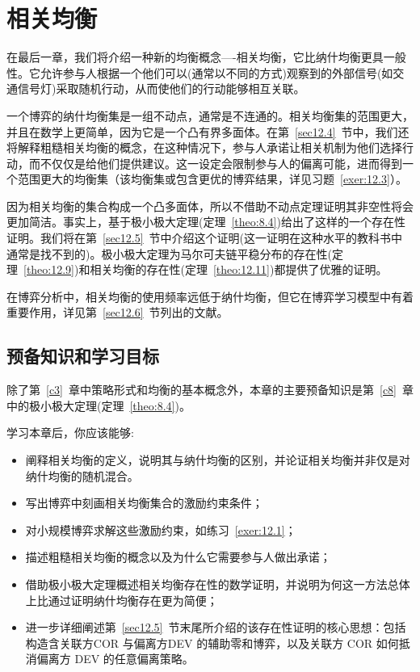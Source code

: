 \chapter{ 相关均衡}\label{c12}
\label{ch12:chap12}

在最后一章，我们将介绍一种新的均衡概念----相关均衡，它比纳什均衡更具一般性。它允许参与人根据一个他们可以(通常以不同的方式)观察到的外部信号(如交通信号灯)采取随机行动，从而使他们的行动能够相互关联。

一个博弈的纳什均衡集是一组不动点，通常是不连通的。相关均衡集的范围更大，并且在数学上更简单，因为它是一个凸有界多面体。在第~\ref{sec12.4}~节中，我们还将解释粗糙相关均衡的概念，在这种情况下，参与人承诺让相关机制为他们选择行动，而不仅仅是给他们提供建议。这一设定会限制参与人的偏离可能，进而得到一个范围更大的均衡集（该均衡集或包含更优的博弈结果，详见习题~\ref{exer:12.3}）。

因为相关均衡的集合构成一个凸多面体，所以不借助不动点定理证明其非空性将会更加简洁。事实上，\citet{hart1989}基于极小极大定理(定理~\ref{theo:8.4})给出了这样的一个存在性证明。我们将在第~\ref{sec12.5}~节中介绍这个证明(这一证明在这种水平的教科书中通常是找不到的)。极小极大定理为马尔可夫链平稳分布的存在性(定理~\ref{theo:12.9})和相关均衡的存在性(定理~\ref{theo:12.11})都提供了优雅的证明。

在博弈分析中，相关均衡的使用频率远低于纳什均衡，但它在博弈学习模型中有着重要作用，详见第~\ref{sec12.6}~节列出的文献。

\section{预备知识和学习目标}\label{sec12.1}

除了第~\ref{c3}~章中策略形式和均衡的基本概念外，本章的主要预备知识是第~\ref{c8}~章中的极小极大定理(定理~\ref{theo:8.4})。

学习本章后，你应该能够: \begin{itemize}
\item 阐释相关均衡的定义，说明其与纳什均衡的区别，并论证相关均衡并非仅是对纳什均衡的随机混合。
\item 写出博弈中刻画相关均衡集合的激励约束条件；
\item 对小规模博弈求解这些激励约束，如练习~\ref{exer:12.1}；
\item 描述粗糙相关均衡的概念以及为什么它需要参与人做出承诺；
\item 借助极小极大定理概述相关均衡存在性的数学证明，并说明为何这一方法总体上比通过证明纳什均衡存在更为简便；
\item 进一步详细阐述第~\ref{sec12.5}~节末尾所介绍的该存在性证明的核心思想：包括构造含关联方COR 与偏离方DEV 的辅助零和博弈，以及关联方 COR 如何抵消偏离方 DEV 的任意偏离策略。
\end{itemize}


